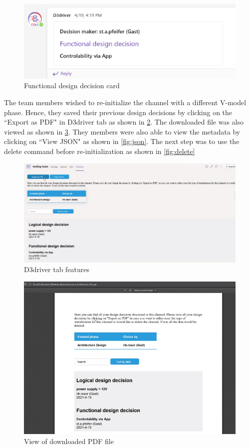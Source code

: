 \begin{enumerate}
\begin{figure}[h]
\centering
\includegraphics[width=0.8\linewidth]{figures/fddadp}
\caption{Functional design decision card}
\label{fig:fddadp}
\end{figure}

The team members wished to re-initialize the channel with a different V-model phase. Hence, they saved their previous design decisions by clicking on the ``Export as PDF" in D3driver tab as shown in \ref{fig:d3dtabadp}. The downloaded file was also viewed as shown in \ref{fig:pdffile}. They members were also able to view the metadata by clicking on ``View JSON" as shown in \ref{fig:json}. The next step was to use the delete command before re-initialization as shown in \ref{fig:delete}

\begin{figure}[h]
\centering
\includegraphics[width=0.8\linewidth]{figures/d3dtabadp}
\caption{D3driver tab features}
\label{fig:d3dtabadp}
\end{figure}

\begin{figure}
\centering
\includegraphics[width=0.7\linewidth]{figures/pdffile}
\caption{View of downloaded PDF file}
\label{fig:pdffile}
\end{figure}



\end{enumerate}
